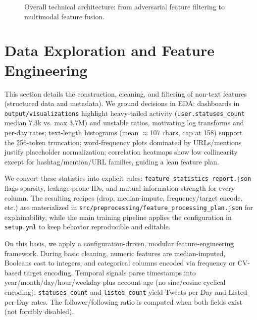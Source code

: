 \documentclass[twocolumn, a4paper, 10pt]{article}
\begin{document}
\begin{figure}[htbp]
\caption{Overall technical architecture: from adversarial feature filtering to multimodal feature fusion.}
\label{fig:architecture}
\end{figure}

\section{Data Exploration and Feature Engineering}
\label{sec:feature_eng}

This section details the construction, cleaning, and filtering of non-text features (structured data and metadata). We ground decisions in EDA: dashboards in \texttt{output/visualizations} highlight heavy-tailed activity (\texttt{user.statuses\_count} median 7.3k vs. max 3.7M) and unstable ratios, motivating log transforms and per-day rates; text-length histograms (mean $\approx$107 chars, cap at 158) support the 256-token truncation; word-frequency plots dominated by URLs/mentions justify placeholder normalization; correlation heatmaps show low collinearity except for hashtag/mention/URL families, guiding a lean feature plan.

We convert these statistics into explicit rules: \texttt{feature\_statistics\_report.json} flags sparsity, leakage-prone IDs, and mutual-information strength for every column. The resulting recipes (drop, median-impute, frequency/target encode, etc.) are materialized in \texttt{src/preprocessing/feature\_processing\_plan.json} for explainability, while the main training pipeline applies the configuration in \texttt{setup.yml} to keep behavior reproducible and editable.

On this basis, we apply a configuration-driven, modular feature-engineering framework. During basic cleaning, numeric features are median-imputed, Booleans cast to integers, and categorical columns encoded via frequency or CV-based target encoding. Temporal signals parse timestamps into year/month/day/hour/weekday plus account age (no sine/cosine cyclical encoding); \texttt{statuses\_count} and \texttt{listed\_count} yield Tweets-per-Day and Listed-per-Day rates. The follower/following ratio is computed when both fields exist (not forcibly disabled).
\end{document}
